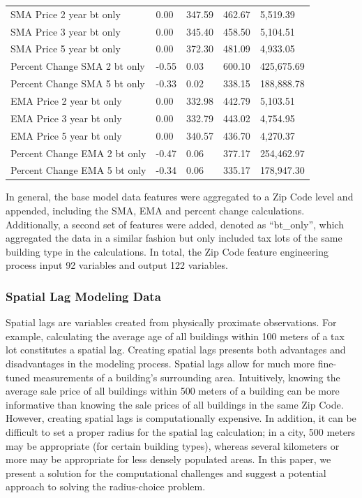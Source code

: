 \documentclass[12pt,]{article}
\begin{document}
\begin{table}
{\begin{tabular}[t]{lllll}
\addlinespace
SMA Price 2 year bt only & 0.00 & 347.59 & 462.67 & 5,519.39\\
SMA Price 3 year bt only & 0.00 & 345.40 & 458.50 & 5,104.51\\
SMA Price 5 year bt only & 0.00 & 372.30 & 481.09 & 4,933.05\\
Percent Change SMA 2 bt only & -0.55 & 0.03 & 600.10 & 425,675.69\\
Percent Change SMA 5 bt only & -0.33 & 0.02 & 338.15 & 188,888.78\\
\addlinespace
EMA Price 2 year bt only & 0.00 & 332.98 & 442.79 & 5,103.51\\
EMA Price 3 year bt only & 0.00 & 332.79 & 443.02 & 4,754.95\\
EMA Price 5 year bt only & 0.00 & 340.57 & 436.70 & 4,270.37\\
Percent Change EMA 2 bt only & -0.47 & 0.06 & 377.17 & 254,462.97\\
Percent Change EMA 5 bt only & -0.34 & 0.06 & 335.17 & 178,947.30\\
\bottomrule
\end{tabular}}
\end{table}

In general, the base model data features were aggregated to a Zip Code
level and appended, including the SMA, EMA and percent change
calculations. Additionally, a second set of features were added, denoted
as ``bt\_only'', which aggregated the data in a similar fashion but only
included tax lots of the same building type in the calculations. In
total, the Zip Code feature engineering process input 92 variables and
output 122 variables.

\hypertarget{spatial-lag-modeling-data}{%
\subsubsection{Spatial Lag Modeling
Data}\label{spatial-lag-modeling-data}}

Spatial lags are variables created from physically proximate
observations. For example, calculating the average age of all buildings
within 100 meters of a tax lot constitutes a spatial lag. Creating
spatial lags presents both advantages and disadvantages in the modeling
process. Spatial lags allow for much more fine-tuned measurements of a
building's surrounding area. Intuitively, knowing the average sale price
of all buildings within 500 meters of a building can be more informative
than knowing the sale prices of all buildings in the same Zip Code.
However, creating spatial lags is computationally expensive. In
addition, it can be difficult to set a proper radius for the spatial lag
calculation; in a city, 500 meters may be appropriate (for certain
building types), whereas several kilometers or more may be appropriate
for less densely populated areas. In this paper, we present a solution
for the computational challenges and suggest a potential approach to
solving the radius-choice problem.
\end{document}
